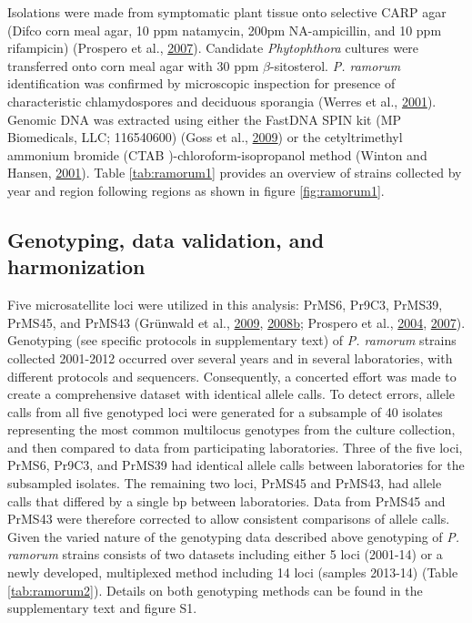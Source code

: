 \documentclass[double,12pt]{beavtex}
\begin{document}
  Isolations were made from symptomatic plant tissue onto selective CARP
  agar (Difco corn meal agar, 10 ppm natamycin, 200pm NA-ampicillin, and
  10 ppm rifampicin) (Prospero et al.,
  \protect\hyperlink{ref-prospero2007population}{2007}). Candidate
  \emph{Phytophthora} cultures were transferred onto corn meal agar with
  30 ppm \(\beta\)-sitosterol. \emph{P. ramorum} identification was
  confirmed by microscopic inspection for presence of characteristic
  chlamydospores and deciduous sporangia (Werres et al.,
  \protect\hyperlink{ref-werres2001phytophthora}{2001}). Genomic DNA was
  extracted using either the FastDNA SPIN kit (MP Biomedicals, LLC;
  116540600) (Goss et al.,
  \protect\hyperlink{ref-goss2009population}{2009}) or the cetyltrimethyl
  ammonium bromide (CTAB )-chloroform-isopropanol method (Winton and
  Hansen, \protect\hyperlink{ref-winton2001molecular}{2001}). Table
  \ref{tab:ramorum1} provides an overview of strains collected by year and
  region following regions as shown in figure \ref{fig:ramorum1}.
  
  \subsection{Genotyping, data validation, and
  harmonization}\label{genotyping-data-validation-and-harmonization}
  
  Five microsatellite loci were utilized in this analysis: PrMS6, Pr9C3,
  PrMS39, PrMS45, and PrMS43 (Grünwald et al.,
  \protect\hyperlink{ref-grunwald2009standardizing}{2009},
  \protect\hyperlink{ref-grunwald2008susceptibility}{2008}\protect\hyperlink{ref-grunwald2008susceptibility}{b};
  Prospero et al., \protect\hyperlink{ref-prospero2004isolation}{2004},
  \protect\hyperlink{ref-prospero2007population}{2007}). Genotyping (see
  specific protocols in supplementary text) of \emph{P. ramorum} strains
  collected 2001-2012 occurred over several years and in several
  laboratories, with different protocols and sequencers. Consequently, a
  concerted effort was made to create a comprehensive dataset with
  identical allele calls. To detect errors, allele calls from all five
  genotyped loci were generated for a subsample of 40 isolates
  representing the most common multilocus genotypes from the culture
  collection, and then compared to data from participating laboratories.
  Three of the five loci, PrMS6, Pr9C3, and PrMS39 had identical allele
  calls between laboratories for the subsampled isolates. The remaining
  two loci, PrMS45 and PrMS43, had allele calls that differed by a single
  bp between laboratories. Data from PrMS45 and PrMS43 were therefore
  corrected to allow consistent comparisons of allele calls. Given the
  varied nature of the genotyping data described above genotyping of
  \emph{P. ramorum} strains consists of two datasets including either 5
  loci (2001-14) or a newly developed, multiplexed method including 14
  loci (samples 2013-14) (Table \ref{tab:ramorum2}). Details on both
  genotyping methods can be found in the supplementary text and figure S1.
  
\end{document}
